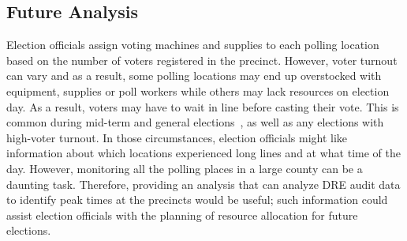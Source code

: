 \subsection{Future Analysis}
Election officials assign voting machines and supplies to each polling
location based on the number of voters registered in the precinct.
However, voter turnout can vary and as a result, some polling
locations may end up overstocked with equipment, supplies or poll
workers while others may lack resources on election day. As a result,
voters may have to wait in line before casting their vote. This is
common during mid-term and general elections~\cite{Kreitman2010,
  Slade2008, U2010}, as well as any elections with high-voter turnout.
In those circumstances, election officials might like information
about which locations experienced long lines and at what time of the
day. However, monitoring all the polling places in a large county can
be a daunting task. Therefore, providing an analysis that can analyze
DRE audit data to identify peak times at the precincts would be useful; such
information could assist election officials with the planning of
resource allocation for future elections.

\begin{comment}
This analysis reports busy locations by detecting heavily used voting terminals. It requires an event log that captures every vote cast event along with an accurate time stamp and precinct location information. In our analysis we find this information in the event log and the ballot image file. When there are consecutive ballots cast in all machines in a polling location with no time delay in between, we are able to infer that there is a steady flow of voters and possibly a line of voters waiting to use the voting machines. 
\end{comment}

